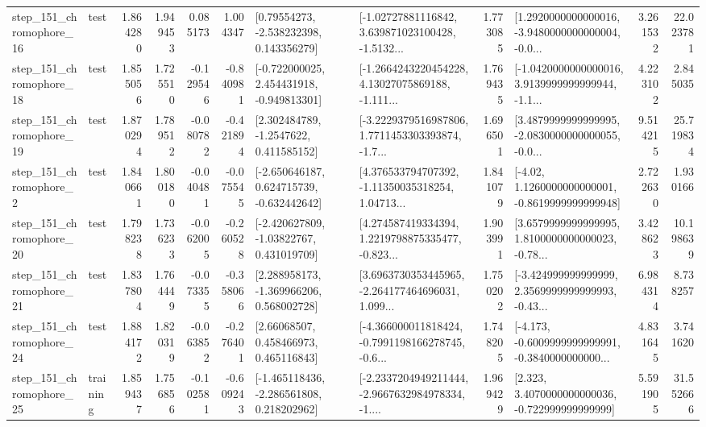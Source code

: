 \begin{tabular}{llrrrrllrlrr}
  step\_151\_chromophore\_16 &      test &      1.864280 &    1.949453 &      0.085173 &  1.004347 &     [0.79554273, -2.538232398, 0.143356279] &  [-1.02727881116842, 3.639871023100428, -1.5132... &       1.773085 &  [1.2920000000000016, -3.9480000000000004, -0.0... &            3.261532 &         22.023781 \\
  step\_151\_chromophore\_18 &      test &      1.855056 &    1.725510 &     -0.129546 & -0.840981 &   [-0.722000025, 2.454431918, -0.949813301] &  [-1.2664243220454228, 4.13027075869188, -1.111... &       1.769435 &  [-1.0420000000000016, 3.9139999999999944, -1.1... &            4.223102 &          2.845035 \\
  step\_151\_chromophore\_19 &      test &      1.870294 &    1.789512 &     -0.080782 & -0.421894 &      [2.302484789, -1.2547622, 0.411585152] &  [-3.2229379516987806, 1.7711453303393874, -1.7... &       1.696501 &  [3.4879999999999995, -2.0830000000000055, -0.0... &            9.514215 &         25.719834 \\
   step\_151\_chromophore\_2 &      test &      1.840661 &    1.800180 &     -0.040481 & -0.075545 &   [-2.650646187, 0.624715739, -0.632442642] &  [4.376533794707392, -1.11350035318254, 1.04713... &       1.841079 &   [-4.02, 1.1260000000000001, -0.8619999999999948] &            2.722630 &          1.930166 \\
  step\_151\_chromophore\_20 &      test &      1.798238 &    1.736233 &     -0.062005 & -0.260528 &    [-2.420627809, -1.03822767, 0.431019709] &  [4.274587419334394, 1.2219798875335477, -0.823... &       1.903991 &  [3.6579999999999995, 1.8100000000000023, -0.78... &            3.428623 &         10.198639 \\
  step\_151\_chromophore\_21 &      test &      1.837804 &    1.764449 &     -0.073355 & -0.358066 &    [2.288958173, -1.369966206, 0.568002728] &  [3.6963730353445965, -2.264177464696031, 1.099... &       1.750202 &  [-3.424999999999999, 2.3569999999999993, -0.43... &            6.984314 &          8.738257 \\
  step\_151\_chromophore\_24 &      test &      1.884172 &    1.820319 &     -0.063852 & -0.276401 &      [2.66068507, 0.458466973, 0.465116843] &  [-4.366000011818424, -0.7991198166278745, -0.6... &       1.748205 &  [-4.173, -0.6009999999999991, -0.3840000000000... &            4.831645 &          3.741620 \\
  step\_151\_chromophore\_25 &  training &      1.859437 &    1.756856 &     -0.102581 & -0.609243 &   [-1.465118436, -2.286561808, 0.218202962] &  [-2.2337204949211444, -2.9667632984978334, -1.... &       1.969429 &    [2.323, 3.4070000000000036, -0.722999999999999] &            5.591905 &         31.552666 \\

\end{tabular}
